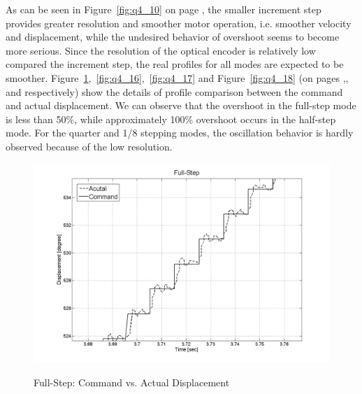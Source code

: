 \documentclass{article}
\theoremstyle{plain}
\theoremstyle{definition}
\theoremstyle{remark}
\begin{document}
As can be seen in Figure~\ref{fig:q4_10} on page \pageref{fig:q4_10}, the smaller increment step provides greater resolution and smoother motor operation, i.e. smoother velocity and displacement, while the undesired behavior of overshoot seems to become more serious. Since the resolution of the optical encoder is relatively low compared the increment step, the real profiles for all modes are expected to be smoother. Figure~\ref{fig:q4_15},~\ref{fig:q4_16},~\ref{fig:q4_17} and Figure~\ref{fig:q4_18} (on pages \pageref{fig:q4_15},\pageref{fig:q4_16},\pageref{fig:q4_17} and \pageref{fig:q4_18} respectively) show the details of profile comparison between the command and actual displacement. We can observe that the overshoot in the full-step mode is less than 50\%, while approximately 100\% overshoot occurs in the half-step mode. For the quarter and 1/8 stepping modes, the oscillation behavior is hardly observed because of the low resolution. \\

\begin{figure}[htb]
\begin{center}
\includegraphics[width=14cm]{Q4_full_step_L.png}
\caption{Full-Step: Command vs. Actual Displacement} \label{tex}
\label{fig:q4_15}
\end{center}
\end{figure}
\end{document}
